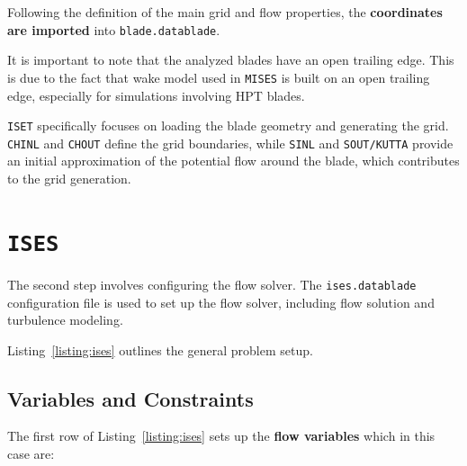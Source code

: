 Following the definition of the main grid and flow properties, the \textbf{coordinates are imported} into \texttt{blade.datablade}.

It is important to note that the analyzed blades have an open trailing edge. This is due to the fact that wake model used in \texttt{MISES} is built on an open trailing edge, especially for simulations involving HPT blades.

\texttt{ISET} specifically focuses on loading the blade geometry and generating the grid. \texttt{CHINL} and \texttt{CHOUT} define the grid boundaries, while \texttt{SINL} and \texttt{SOUT/KUTTA} provide an initial approximation of the potential flow around the blade, which contributes to the grid generation.

\section{\texttt{ISES}}



The second step involves configuring the flow solver. The \texttt{ises.datablade} configuration file is used to set up the flow solver, including flow solution and turbulence modeling.

Listing~\ref{listing:ises} outlines the general problem setup.



\subsection{Variables and Constraints}

The first row of Listing~\ref{listing:ises} sets up the \textbf{flow variables} which in this case are:



